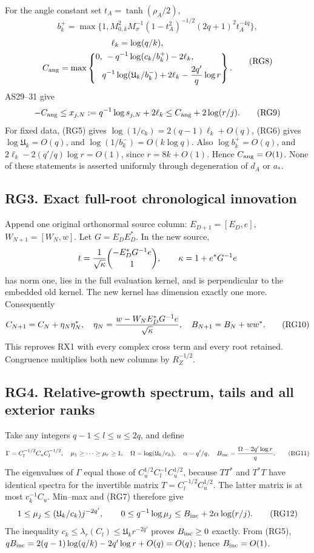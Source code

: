 \documentclass[11pt]{article}
\begin{document}
For the angle constant set \(t_A=\tanh(\rho_A/2)\), \[
b_k^+=\max\{1,M_{0,k}^2M_\sigma^{-1}(1-t_A^2)^{-1/2}(2q+1)^2t_A^{-4q}\},
\] \[
\begin{gathered}
\ell_k=\log(q/k),\\
C_{\rm ang}=\max\left\{\begin{aligned}0,&\ -q^{-1}\log(c_k/b_k^+)-2\ell_k,\\
&q^{-1}\log(\mathfrak U_k/b_k^-)+2\ell_k-{2q'\over q}\log r\end{aligned}\right\}.
\end{gathered}
\tag{RG8}
\] AS29--31 give \[
-C_{\rm ang}\le x_{j,N}:=q^{-1}\log s_{j,N}+2\ell_k
\le C_{\rm ang}+2\log(r/j).
\tag{RG9}
\] For fixed data, (RG5) gives \(\log(1/c_k)=2(q-1)\ell_k+O(q)\), (RG6) gives \(\log\mathfrak U_k=O(q)\), and \(\log(1/b_k^-)=O(k\log q)\). Also \(\log b_k^+=O(q)\), and \(2\ell_k-2(q'/q)\log r=O(1)\), since \(r=8k+O(1)\). Hence \(C_{\rm ang}=O(1)\). None of these statements is asserted uniformly through degeneration of \(d_A\) or \(a_*\).

\subsection{RG3. Exact full-root chronological innovation}\label{rg3.-exact-full-root-chronological-innovation}

Append one original orthonormal source column: \(E_{D+1}=[E_D,e]\), \(W_{N+1}=[W_N,w]\). Let \(G=E_DE_D^*\). In the new source, \[
t={1\over\sqrt\kappa}\binom{-E_D^*G^{-1}e}{1},\qquad
\kappa=1+e^*G^{-1}e
\] has norm one, lies in the full evaluation kernel, and is perpendicular to the embedded old kernel. The new kernel has dimension exactly one more. Consequently \[
C_{N+1}=C_N+\eta_N\eta_N^*,\quad
\eta_N={w-W_NE_D^*G^{-1}e\over\sqrt\kappa},\quad
B_{N+1}=B_N+ww^*.
\tag{RG10}
\] This reproves RX1 with every complex cross term and every root retained. Congruence multiplies both new columns by \(R_Z^{-1/2}\).

\subsection{RG4. Relative-growth spectrum, tails and all exterior ranks}\label{rg4.-relative-growth-spectrum-tails-and-all-exterior-ranks}

Take any integers \(q-1\le l\le u\le2q\), and define \[
\Gamma=C_l^{-1/2}C_uC_l^{-1/2},\quad
\mu_1\ge\cdots\ge\mu_r\ge1,\quad
\Omega=\log(\mathfrak U_k/c_k),\quad\alpha=q'/q,\quad
B_{\rm inc}={\Omega-2q'\log r\over q}.
\tag{RG11}
\] The eigenvalues of \(\Gamma\) equal those of \(C_u^{1/2}C_l^{-1}C_u^{1/2}\), because \(TT^*\) and \(T^*T\) have identical spectra for the invertible matrix \(T=C_l^{-1/2}C_u^{1/2}\). The latter matrix is at most \(c_k^{-1}C_u\). Min--max and (RG7) therefore give \[
1\le\mu_j\le(\mathfrak U_k/c_k)j^{-2q'},\qquad
0\le q^{-1}\log\mu_j\le B_{\rm inc}+2\alpha\log(r/j).
\tag{RG12}
\] The inequality \(c_k\le\lambda_r(C_l)\le\mathfrak U_kr^{-2q'}\) proves \(B_{\rm inc}\ge0\) exactly. From (RG5), \(qB_{\rm inc}=2(q-1)\log(q/k)-2q'\log r+O(q)=O(q)\); hence \(B_{\rm inc}=O(1)\).
\end{document}
